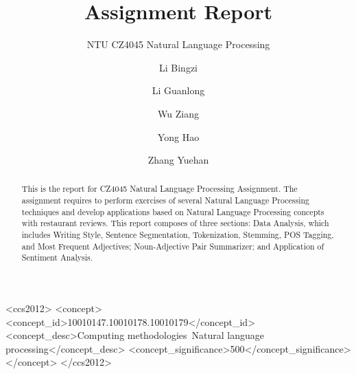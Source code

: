 \documentclass[sigconf]{acmart}
\begin{document}
\title{Assignment Report}
\subtitle{NTU CZ4045 Natural Language Processing}

\author{Li Bingzi}

\author{Li Guanlong}

\author{Wu Ziang}

\author{Yong Hao}

\author{Zhang Yuehan}


\begin{abstract}
This is the report for CZ4045 Natural Language Processing Assignment. The assignment requires to perform exercises of several Natural Language Processing techniques and develop applications based on Natural Language Processing concepts with restaurant reviews. This report composes of three sections: Data Analysis, which includes Writing Style, Sentence Segmentation, Tokenization, Stemming, POS Tagging, and Most Frequent Adjectives; Noun-Adjective Pair Summarizer; and Application of Sentiment Analysis.
\end{abstract}

\begin{CCSXML}
<ccs2012>
<concept>
<concept_id>10010147.10010178.10010179</concept_id>
<concept_desc>Computing methodologies~Natural language processing</concept_desc>
<concept_significance>500</concept_significance>
</concept>
</ccs2012>
\end{CCSXML}



\maketitle
\end{document}
